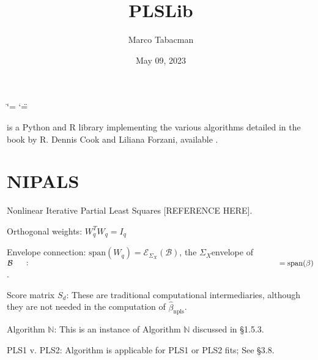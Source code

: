 \documentclass[letterpaper,10pt,english]{sphinxmanual}
\title{PLSLib}
\date{May 09, 2023}
\author{Marco Tabacman}
\begin{document}
\ifdefined\shorthandoff
  \ifnum\catcode`\=\string=\active\shorthandoff{=}\fi
  \ifnum\catcode`\"=\active{}\fi
\fi

\pagestyle{empty}
\sphinxmaketitle
\pagestyle{plain}
\sphinxtableofcontents
\pagestyle{normal}
\label{\detokenize{index::doc}}


\sphinxAtStartPar
{} is a Python and R library implementing the various algorithms detailed in the book  by R. Dennis Cook and Liliana Forzani, available .

\sphinxstepscope


\chapter{NIPALS}
\label{\detokenize{NIPALS:nipals}}\label{\detokenize{NIPALS::doc}}
\sphinxAtStartPar
Nonlinear Iterative Partial Least Squares {[}REFERENCE HERE{]}.

\begin{fulllineitems}
\label{\detokenize{NIPALS:NIPALS.nipals.nipals}}
\pysigstartsignatures
{}
\pysigstopsignatures
\sphinxAtStartPar
Orthogonal weights: \(W^T_q W_q = I_q\)

\sphinxAtStartPar
Envelope connection: \(\mathrm{span}(W_q) = \mathcal{E}_{\Sigma_X}(\mathcal{B})\), the \(\Sigma_X\)\sphinxhyphen{}envelope of \(\mathcal{B} \mathrel{\vcenter{:}}= \mathrm{span}(\beta)\).

\sphinxAtStartPar
Score matrix \(S_d\): These are traditional computational intermediaries,
although they are not needed in the computation of \(\hat{\beta}_{\mathrm{npls}}\).

\sphinxAtStartPar
Algorithm \(\mathbb{N}\): This is an instance of Algorithm \(\mathbb{N}\) discussed in \S{}1.5.3.

\sphinxAtStartPar
PLS1 v. PLS2: Algorithm is applicable for PLS1 or PLS2 fits; See \S{}3.8.

\end{fulllineitems}

\end{document}

